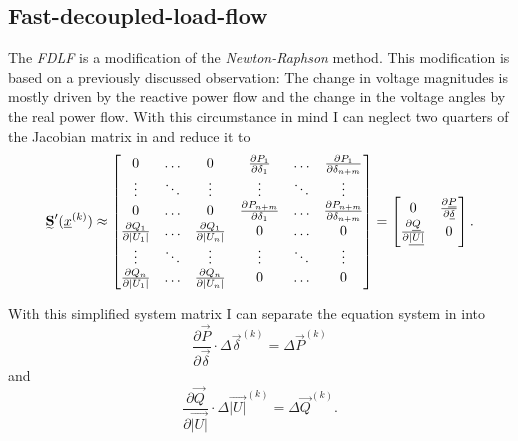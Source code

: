\subsection{Fast-decoupled-load-flow}
\label{sec:fdlf}

The \emph{FDLF} \cite{fdlf} is a modification of the \emph{Newton-Raphson} method. This modification is based on a previously discussed observation: The change in voltage magnitudes is mostly driven by the reactive power flow and the change in the voltage angles by the real power flow. With this circumstance in mind I can neglect two quarters of the Jacobian matrix in  and reduce it to
\begin{equation}
	\mat S' (\vec x^{(k)}) \approx 
	\begin{bmatrix}
		0	& \hdots	& 0	& \frac{\partial P_1}{\partial \delta_1}	& \hdots	& \frac{\partial P_1}{\partial \delta_{n + m}} \\
		\vdots								& \ddots	& \vdots								& \vdots									& \ddots	& \vdots \\
		0	& \hdots	& 0	& \frac{\partial P_{n + m}}{\partial \delta_1}	& \hdots	& \frac{\partial P_{n + m}}{\partial \delta_{n + m}} \\
		\frac{\partial Q_1}{\partial |U_1|}	& \hdots	& \frac{\partial Q_1}{\partial |U_n|}	& 0	& \hdots	& 0 \\
		\vdots								& \ddots	& \vdots								& \vdots									& \ddots	& \vdots \\
		\frac{\partial Q_n}{\partial |U_1|}	& \hdots	& \frac{\partial Q_n}{\partial |U_n|}	& 0	& \hdots	& 0
	\end{bmatrix} =
	\begin{bmatrix}
		0								&	\frac{\partial \vec P}{\partial \vec \delta} \\
		\frac{\partial \vec Q}{\partial \vec{|U|}}	&	0
	\end{bmatrix}.
\end{equation}

With this simplified system matrix I can separate the equation system in  into
\begin{equation}
	\frac{\partial \vec P}{\partial \vec \delta} \cdot \Delta \vec \delta^{(k)} = \Delta \vec P^{(k)}
\end{equation}
and
\begin{equation}
	\frac{\partial \vec Q}{\partial \vec{|U|}} \cdot \Delta \vec{|U|}^{(k)} = \Delta \vec Q^{(k)}.
\end{equation}

